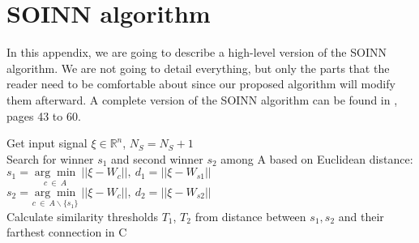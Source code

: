 \appendix
\chapter{SOINN algorithm}
\label{chap:soinn_original_algo}
In this appendix, we are going to describe a high-level version of the SOINN algorithm. We are not going to detail everything, but only the parts that the reader need to be comfortable about since our proposed algorithm will modify them afterward. A complete version of the SOINN algorithm can be found in \cite{SOINN}, pages 43 to 60.

\begin{algorithm}
    Get input signal $\xi \in \mathbb{R}^n$, $N_S = N_S + 1$ \\
    Search for winner $s_1$ and second winner $s_2$ among A based on Euclidean distance: \\
    $s_1 = \underset{c ~\in ~A}{\arg\min}~||\xi - W_{c}||, ~d_1 = ||\xi - W_{s1}||$ \\
    $s_2 = \underset{c ~\in ~A\backslash\{s_1\}}{\arg\min}~||\xi - W_{c}||, ~d_2 = ||\xi - W_{s2}||$ \\
    Calculate similarity thresholds $T_1$, $T_2$ from distance between $s_1,s_2$ and their farthest connection in C
\end{algorithm}

